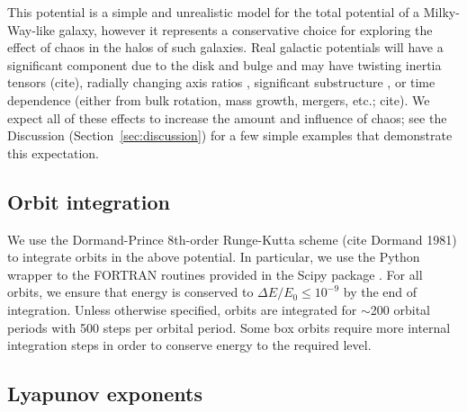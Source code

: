 \documentclass[letterpaper,12pt,preprint]{aastex}
\begin{document}
This potential is a simple and unrealistic model for the total potential of a Milky-Way-like galaxy, however it represents a conservative choice for exploring the effect of chaos in the halos of such galaxies. Real galactic potentials will have a significant component due to the disk and bulge and may have twisting inertia tensors (cite), radially changing axis ratios \citep[e.g.,][]{veraciro11}, significant substructure \citep{zemp09}, or time dependence (either from bulk rotation, mass growth, mergers, etc.; cite). We expect all of these effects to increase the amount and influence of chaos; see the Discussion (Section~\ref{sec:discussion}) for a few simple examples that demonstrate this expectation.

\subsection{Orbit integration}\label{sec:integration}

We use the Dormand-Prince 8th-order Runge-Kutta scheme (cite Dormand 1981) to integrate orbits in the above potential. In particular, we use the Python wrapper to the FORTRAN routines provided in the Scipy package \citep{scipy}. For all orbits, we ensure that energy is conserved to $\Delta E/E_0 \leq 10^{-9}$ by the end of integration. Unless otherwise specified, orbits are integrated for $\sim$200 orbital periods with 500 steps per orbital period. Some box orbits require more internal integration steps in order to conserve energy to the required level. 

\subsection{Lyapunov exponents}
\end{document}
